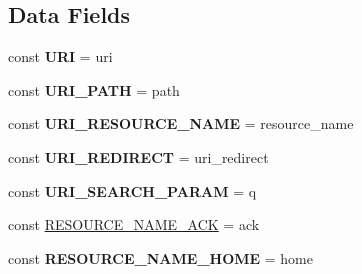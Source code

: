 \subsection*{Data Fields}
\begin{DoxyCompactItemize}
\item 
\hypertarget{interface_able_polecat___message___request_interface_ae8f2644cc12163a8b104c3ec6727ae3d}{}const {\bfseries U\+R\+I} = \textquotesingle{}uri\textquotesingle{}\label{interface_able_polecat___message___request_interface_ae8f2644cc12163a8b104c3ec6727ae3d}

\item 
\hypertarget{interface_able_polecat___message___request_interface_af0e8f16a6215d6c08bacc2ab85269be6}{}const {\bfseries U\+R\+I\+\_\+\+P\+A\+T\+H} = \textquotesingle{}path\textquotesingle{}\label{interface_able_polecat___message___request_interface_af0e8f16a6215d6c08bacc2ab85269be6}

\item 
\hypertarget{interface_able_polecat___message___request_interface_a338a1b904d68254dc1d5ca30a68c7a2f}{}const {\bfseries U\+R\+I\+\_\+\+R\+E\+S\+O\+U\+R\+C\+E\+\_\+\+N\+A\+M\+E} = \textquotesingle{}resource\+\_\+name\textquotesingle{}\label{interface_able_polecat___message___request_interface_a338a1b904d68254dc1d5ca30a68c7a2f}

\item 
\hypertarget{interface_able_polecat___message___request_interface_ac3264037680f6777d0b1f1f41c10e612}{}const {\bfseries U\+R\+I\+\_\+\+R\+E\+D\+I\+R\+E\+C\+T} = \textquotesingle{}uri\+\_\+redirect\textquotesingle{}\label{interface_able_polecat___message___request_interface_ac3264037680f6777d0b1f1f41c10e612}

\item 
\hypertarget{interface_able_polecat___message___request_interface_aabac9c0415cb1fc8114f38584031d039}{}const {\bfseries U\+R\+I\+\_\+\+S\+E\+A\+R\+C\+H\+\_\+\+P\+A\+R\+A\+M} = \textquotesingle{}q\textquotesingle{}\label{interface_able_polecat___message___request_interface_aabac9c0415cb1fc8114f38584031d039}

\item 
const \hyperlink{interface_able_polecat___message___request_interface_aa207fcff72e63e4066e944379ff91baf}{R\+E\+S\+O\+U\+R\+C\+E\+\_\+\+N\+A\+M\+E\+\_\+\+A\+C\+K} = \textquotesingle{}ack\textquotesingle{}
\item 
\hypertarget{interface_able_polecat___message___request_interface_ab26b44d36673bcdffd6d95d1322eceb0}{}const {\bfseries R\+E\+S\+O\+U\+R\+C\+E\+\_\+\+N\+A\+M\+E\+\_\+\+H\+O\+M\+E} = \textquotesingle{}home\textquotesingle{}\label{interface_able_polecat___message___request_interface_ab26b44d36673bcdffd6d95d1322eceb0}


\end{DoxyCompactItemize}
